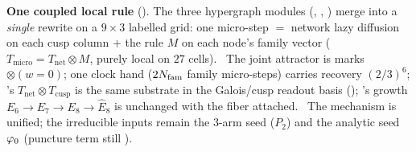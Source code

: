 \par\smallskip\noindent\textbf{One coupled local rule}
(). The three hypergraph modules (,
, ) merge
into a \emph{single} rewrite on a $9{\times}3$ labelled grid: one micro-step $=$ network lazy diffusion on each
cusp column $+$ the  rule $M$ on each node's family vector ($T_{\mathrm{micro}}{=}T_{\mathrm{net}}\otimes
M$, purely local on $27$ cells). \mE\ The joint attractor is marks$\otimes(w{=}0)$; one clock hand ($2N_{\mathrm{fam}}$ family
micro-steps) carries recovery $(2/3)^6$; 's $T_{\mathrm{net}}\otimes T_{\mathrm{cusp}}$ is the same
substrate in the Galois/cusp readout basis (); 's growth $E_6{\to}E_7{\to}E_8{\to}\hat E_8$ is
unchanged with the fiber attached. \mO\ The mechanism is unified; the irreducible inputs remain the $3$-arm seed
($P_2$) and the analytic seed $\varphi_0$ (puncture term still ).

